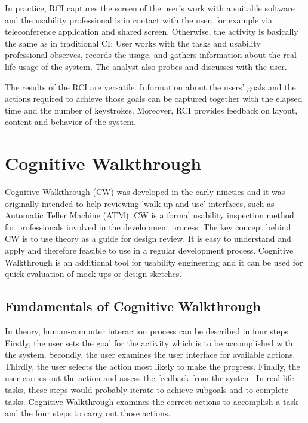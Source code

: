 \documentclass[12pt,a4paper,oneside,pdftex]{report}
\begin{document}
In practice, RCI captures the screen of the user's work with a suitable software and the usability professional is in contact with the user, for example via teleconference application and shared screen. Otherwise, the activity is basically the same as in traditional CI: User works with the tasks and usability professional observes, records the usage, and gathers information about the real-life usage of the system. The analyst also probes and discusses with the user. \cite{RefWorks:32}

The results of the RCI are versatile. Information about the users' goals and the actions required to achieve those goals can be captured together with the elapsed time and the number of keystrokes. Moreover, RCI provides feedback on layout, content and behavior of the system. \cite{RefWorks:32}
 
\section{Cognitive Walkthrough}
\label{sec:cognitivewalkthrough}

Cognitive Walkthrough (CW) was developed in the early nineties and it was originally intended to help reviewing 'walk-up-and-use' interfaces, such as Automatic Teller Machine (ATM). CW is a formal usability inspection method for professionals involved in the development process. The key concept behind CW is to use theory as a guide for design review. It is easy to understand and apply and therefore feasible to use in a regular development process. \cite{RefWorks:19, RefWorks:18} Cognitive Walkthrough is an additional tool for usability engineering and it can be used for quick evaluation of mock-ups or design sketches. \cite{RefWorks:34}

\subsection{Fundamentals of Cognitive Walkthrough}

In theory, human-computer interaction process can be described in four steps. Firstly, the user sets the goal for the activity which is to be accomplished with the system. Secondly, the user examines the user interface for available actions. Thirdly, the user selects the action most likely to make the progress. Finally, the user carries out the action and assess the feedback from the system. In real-life tasks, these steps would probably iterate to achieve subgoals and to complete tasks. Cognitive Walkthrough examines the correct actions to accomplish a task and the four steps to carry out those actions. \cite{RefWorks:34}
\end{document}

